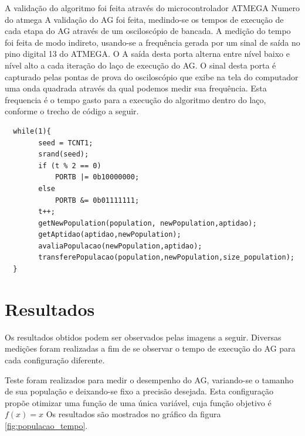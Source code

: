 \documentclass[
    12pt,               %
    oneside,%
    a4paper,            %
    english,            %
    french,             %
    spanish,            %
    brazil,             %
    ]{abntex2}
\begin{document}
  A validação do algoritmo foi feita através do microcontrolador ATMEGA  Numero do atmega
  A validação do AG foi feita, medindo-se os tempos de execução de cada etapa do AG através de um osciloscópio de bancada. A medição do tempo foi feita de modo indireto, usando-se a frequência gerada por um sinal de saída no pino digital 13  do ATMEGA. O A saída desta porta alterna entre nível baixo e nível alto a cada iteração do laço de execução do AG. O sinal desta porta é capturado pelas pontas de prova do osciloscópio que exibe na tela do computador uma onda quadrada através da qual podemos medir sua frequência. Esta frequencia é o tempo gasto para a execução do algoritmo dentro do laço, conforme o trecho de código a seguir.

  \begin{verbatim}
  while(1){  
        seed = TCNT1;
        srand(seed);        
        if (t % 2 == 0)
            PORTB |= 0b10000000;
        else
            PORTB &= 0b01111111; 
        t++;        
        getNewPopulation(population, newPopulation,aptidao);
        getAptidao(aptidao,newPopulation);        
        avaliaPopulacao(newPopulation,aptidao);       
        transferePopulacao(population,newPopulation,size_population);                 
  }
  \end{verbatim}

\section{Resultados}
	
  Os resultados obtidos podem ser observados pelas imagens a seguir. Diversas medições foram realizadas a fim de se observar o tempo de execução do AG para cada configuração diferente.

  Teste foram realizados para medir o desempenho do AG, variando-se o tamanho de sua população e deixando-se fixo a precisão desejada. Esta configuração propõe otimizar uma função de uma única variável, cuja função objetivo é $f(x) = x$  Os resultados são mostrados no gráfico da figura \ref{fig:populacao_tempo}.
\end{document}
